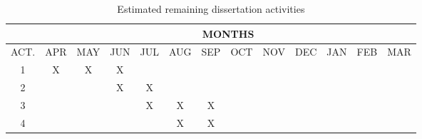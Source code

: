 \documentclass[oneside,12pt]{scrbook}
\theoremstyle{definition}
\theoremstyle{plain}
\theoremstyle{definition}
\begin{document}
\begin{table}[]
	\centering
	\caption{Estimated remaining dissertation activities}
	\label{my-label}
	\begin{tabular}{c|c|c|c|c|c|c|c|c|c|c|c|c|}
		\cline{2-13}
		\multicolumn{1}{l|}{}      & \multicolumn{12}{c|}{MONTHS}                                                                                                                                                                                                                                                                                                      \\ \hline
		\multicolumn{1}{|c|}{ACT.} & \multicolumn{1}{l|}{APR} & \multicolumn{1}{l|}{MAY} & \multicolumn{1}{l|}{JUN} & \multicolumn{1}{l|}{JUL} & \multicolumn{1}{l|}{AUG} & \multicolumn{1}{l|}{SEP} & \multicolumn{1}{l|}{OCT} & \multicolumn{1}{l|}{NOV} & \multicolumn{1}{l|}{DEC} & \multicolumn{1}{l|}{JAN} & \multicolumn{1}{l|}{FEB} & \multicolumn{1}{l|}{MAR} \\ \hline
		\multicolumn{1}{|c|}{1}    & X                        & X                        & X                        &                          &                          &                          &                          &                          &                          &                          &                          &                          \\ \hline
		\multicolumn{1}{|c|}{2}    &                          &                          & X                        & X                        &                          &                          &                          &                          &                          &                          &                          &                          \\ \hline
		\multicolumn{1}{|c|}{3}    &                          &                          &                          & X                        & X                        & X                        &                          &                          &                          &                          &                          &                          \\ \hline
		\multicolumn{1}{|c|}{4}    &                          &                          &                          &                          & X                        & X                        &                          &                          &                          &                          &                          &                          \\ \hline

\end{tabular}
\end{table}
\end{document}
